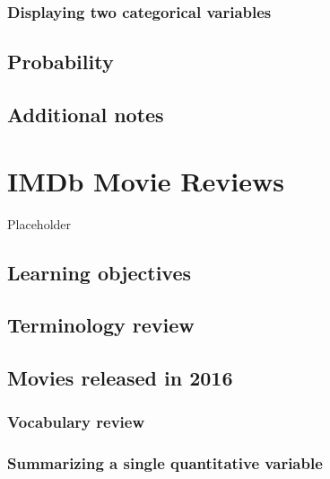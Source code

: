 \documentclass[
]{report}
\begin{document}
\hypertarget{displaying-two-categorical-variables}{%
\subsection{Displaying two categorical variables}\label{displaying-two-categorical-variables}}

\hypertarget{probability}{%
\section{Probability}\label{probability}}

\hypertarget{additional-notes}{%
\section{Additional notes}\label{additional-notes}}

\hypertarget{imdb-movie-reviews}{%
\chapter{IMDb Movie Reviews}\label{imdb-movie-reviews}}

Placeholder

\hypertarget{learning-objectives}{%
\section{Learning objectives}\label{learning-objectives}}

\hypertarget{terminology-review}{%
\section{Terminology review}\label{terminology-review}}

\hypertarget{movies-released-in-2016}{%
\section{Movies released in 2016}\label{movies-released-in-2016}}

\hypertarget{vocabulary-review}{%
\subsection{Vocabulary review}\label{vocabulary-review}}

\hypertarget{summarizing-a-single-quantitative-variable}{%
\subsection{Summarizing a single quantitative variable}\label{summarizing-a-single-quantitative-variable}}
\end{document}
